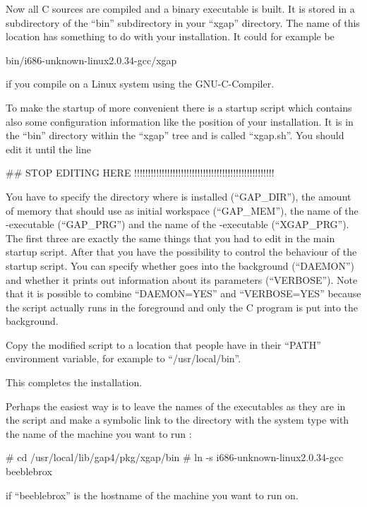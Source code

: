 Now all C sources are compiled and a binary executable is built. It is
stored in a subdirectory of the ``bin'' subdirectory in your ``xgap''
directory. The name of this location has something to do with your
installation. It could for example be

\begintt
bin/i686-unknown-linux2.0.34-gcc/xgap
\endtt

if you compile on a Linux system using the GNU-C-Compiler.


To make the startup of {\XGAP} more convenient there is a startup script
which contains also some configuration information like the position of
your {\GAP} installation. It is in the ``bin'' directory within the
``xgap'' tree and is called ``xgap.sh''. You should edit it until the line

\begintt
##  STOP EDITING HERE !!!!!!!!!!!!!!!!!!!!!!!!!!!!!!!!!!!!!!!!!!!!!!!!!!!
\endtt

You have to specify the directory where {\GAP} is installed (``GAP\_DIR''), 
the amount of memory that {\GAP} should use as initial workspace
(``GAP\_MEM''), the name of the {\GAP}-executable (``GAP\_PRG'') and the
name of the {\XGAP}-executable (``XGAP\_PRG''). The first three are exactly 
the same things that you had to edit in the main {\GAP} startup script.
After that you have the possibility to control the behaviour of the {\XGAP}
startup script. You can specify whether {\XGAP} goes into the background
(``DAEMON'') and whether it prints out information about its parameters
(``VERBOSE''). Note that it is possible to combine ``DAEMON=YES''
and ``VERBOSE=YES'' because the script actually runs in the foreground and
only the C program is put into the background.

Copy the modified script to a location that people have in their ``PATH''
environment variable, for example to ``/usr/local/bin''.

This completes the installation.

Perhaps the easiest way is to leave the names of the executables as they
are in the script and make a symbolic link to the directory with the system 
type with the name of the machine you want to run {\XGAP}:

\begintt
# cd /usr/local/lib/gap4/pkg/xgap/bin
# ln -s i686-unknown-linux2.0.34-gcc beeblebrox
\endtt

if ``beeblebrox'' is the hostname of the machine you want to run {\XGAP}
on.


